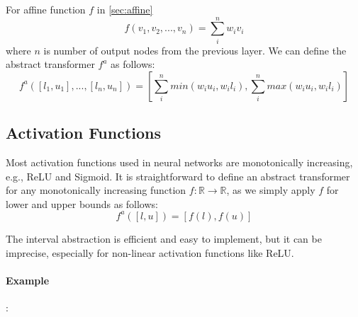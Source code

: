 \documentclass[oneside,11pt,dvipsnames]{book}
\numberwithin{equation}{section}
\theoremstyle{definition}
\theoremstyle{remark}
\begin{document}
For affine function \(f\) in \ref{sec:affine}
\[f(v_1, v_2, ...,v_n) = \sum_{i}^{n}w_iv_i\]
where $n$ is number of output nodes from the previous layer. We can define the abstract transformer \(f^a\) as follows:
\[f^{a}([l_1, u_1],...,[l_n, u_n]) = [\sum_{i}^{n}min(w_iu_i, w_il_i), \sum_{i}^{n}max(w_iu_i, w_il_i)]\]




\subsection{Activation Functions}

Most activation functions used in neural networks are monotonically increasing, e.g., ReLU and Sigmoid. It is straightforward to define
an abstract transformer for any monotonically increasing function \(f : \mathbb{R} \to \mathbb{R}\), as we simply apply \(f\) for lower and upper bounds as follows:
\[f^a
([l, u]) = [ f(l), f(u)]
\]

The interval abstraction is efficient and easy to implement, but it can be imprecise, especially for non-linear activation functions like ReLU. 

\paragraph{Example}: 
\end{document}
